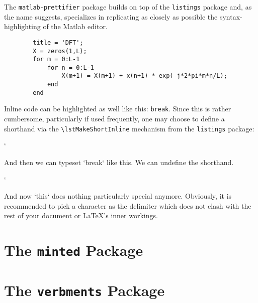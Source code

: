 \documentclass[article,a4paper,oneside,10pt]{memoir}
\newcommand\code[1]{\texttt{#1}}
\begin{document}
The  \code{matlab-prettifier} package  builds  on top  of the  \code{listings}
package and,  as the name suggests,  specializes in replicating as  closely as
possible the syntax-highlighting of the Matlab editor.

\begin{tcblisting}{}
    
\end{tcblisting}

\begin{tcblisting}{}
    \begin{lstlisting}[gobble=8,style=Matlab-bw]
        % Discrete Fourier Transform of said signal
        title = 'DFT';
        X = zeros(1,L);
        for m = 0:L-1
            for n = 0:L-1
                X(m+1) = X(m+1) + x(n+1) * exp(-j*2*pi*m*n/L);
            end
        end
    \end{lstlisting}
\end{tcblisting}

\begin{tcblisting}{}
    Inline    code    can    be     highlighted    as    well    like    this:
    \lstinline[style=Matlab-pyglike]!break!.  Since this is rather cumbersome,
    particularly if used frequently, one may  choose to define a shorthand via
    the \verb|\lstMakeShortInline| mechanism from the \verb|listings| package:

    \lstMakeShortInline[style=Matlab-pyglike]`

    And then we can typeset `break` like this. We can undefine the shorthand.

    \lstDeleteShortInline`

    And now `this`  does nothing particularly special  anymore.  Obviously, it
    is recommended to  pick a character as the delimiter  which does not clash
    with the rest of your document or \LaTeX's inner workings.

\end{tcblisting}


\chapter{The \code{minted} Package \cite{minted}}
\label{chap:minted}


\chapter{The \code{verbments} Package \cite{verbments}}
\label{chap:minted}
\end{document}
